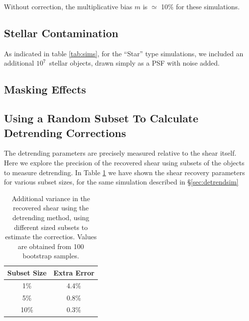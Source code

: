 \documentclass[usegraphicx,usenatbib]{mn2e}
\newcommand{\nsimNstar}{$10^7$}
\begin{document}
Without correction, the multiplicative bias $m$ is $\simeq$ 10\%
for these simulations.

\subsection{Stellar Contamination} \label{sec:stars}

As indicated in table \ref{tab:sims}, for the ``Star'' type simulations, we
included an additional \nsimNstar\ stellar objects, drawn simply as a PSF with
noise added.

\subsection{Masking Effects} \label{sec:masking}


\subsection{Using a Random Subset To Calculate Detrending Corrections}

The detrending parameters are precisely measured relative to the shear itself.
Here we explore the precision of the recovered shear using subsets of
the objects to measure detrending.  In Table \ref{tab:subsets} we 
have shown the
shear recovery parameters for various subset sizes, for the same simulation
described in \S \ref{sec:detrendsim}

\begin{table}[h] 
    \centering
    \caption{Additional variance in the recovered shear using the
        detrending method, using different sized subsets to
        estimate the correctios.  Values are obtained
        from 100 bootstrap samples. \label{tab:subsets}}
    \begin{tabular}{| c | c |}
        Subset Size & Extra Error \\
        \hline
        1\% & 4.4\% \\
        5\% & 0.8\% \\
        10\% & 0.3\% \\
    \end{tabular}
\end{table}
\end{document}
